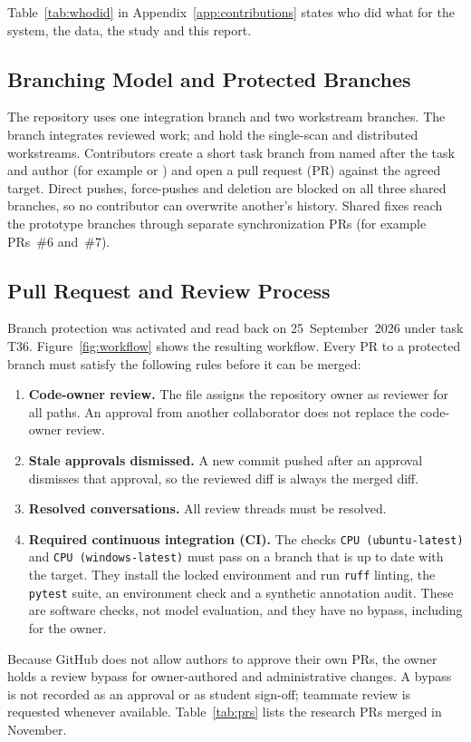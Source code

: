 Table~\ref{tab:whodid} in Appendix~\ref{app:contributions} states who did what for the
system, the data, the study and this report.

\subsection{Branching Model and Protected Branches}
The repository uses one integration branch and two workstream branches. The
 branch integrates reviewed work;  and
 hold the single-scan and distributed workstreams.
Contributors create a short task branch from  named after the task
and author (for example  or ) and open
a pull request (PR) against the agreed target. Direct pushes, force-pushes and
deletion are blocked on all three shared branches, so no contributor can overwrite
another's history. Shared fixes reach the prototype branches through separate
synchronization PRs (for example PRs~\#6 and~\#7).

\subsection{Pull Request and Review Process}
Branch protection was activated and read back on 25~September~2026 under task
T36. Figure~\ref{fig:workflow} shows the resulting workflow. Every PR to a
protected branch must satisfy the following rules before it can be merged:
\begin{enumerate}
\item \textbf{Code-owner review.} The  file assigns the
repository owner as reviewer for all paths. An approval from another collaborator
does not replace the code-owner review.
\item \textbf{Stale approvals dismissed.} A new commit pushed after an approval
dismisses that approval, so the reviewed diff is always the merged diff.
\item \textbf{Resolved conversations.} All review threads must be resolved.
\item \textbf{Required continuous integration (CI).} The checks
\texttt{CPU (ubuntu-latest)} and \texttt{CPU (windows-latest)} must pass on a
branch that is up to date with the target. They install the locked environment and run
\texttt{ruff} linting, the \texttt{pytest} suite, an environment check and a
synthetic annotation audit. These are software checks, not model evaluation, and they
have no bypass, including for the owner.
\end{enumerate}
Because GitHub does not allow authors to approve their own PRs, the owner holds a
review bypass for owner-authored and administrative changes. A bypass is not
recorded as an approval or as student sign-off; teammate review is requested
whenever available. Table~\ref{tab:prs} lists the research PRs merged in November.

